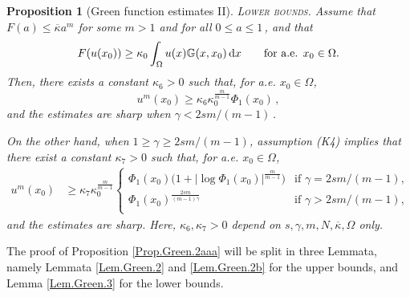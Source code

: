 \documentclass[11pt]{article}
\newtheorem{prop}[thm]{Proposition}
\numberwithin{equation}{section}
\newcommand{\dx}{\,{\rm d}x}
\newcommand{\n}{F}
\newcommand{\ka}{\overline{\kappa}}
\newcommand{\K}{{\mathbb G}}
\begin{document}
\begin{prop}[Green function estimates II]
\noindent\textsc{Lower bounds. }Assume that $F(a)\le \ka a^m$ for some $m>1$ and for all $0\leq a\le 1$\,, and that
\begin{equation}\label{Lem.Green.3.hyp.aaa}
\n(u(x_0))\ge \kappa_0\int_{\Omega} u(x)\K(x,x_0)\dx\qquad\mbox{for a.e. $x_0\in\Omega$.}
\end{equation}
 Then, there exists a constant $\kappa_{6}>0$ such that, for a.e. $x_0\in \Omega$,
\begin{equation}\label{Lem.Green.3.est.Lower.IIx}
 u^m(x_0)  \ge \kappa_6\kappa_0^{\frac{m}{m-1}} \Phi_1(x_0)\,,
\end{equation}
and the estimates are sharp when $\gamma< 2s m/(m-1)$\,.

\noindent On the other hand, when $1\ge \gamma\geq  2s m/(m-1)$, assumption (K4) implies that there exist a constant $\kappa_7>0$ such that, for a.e.  $x_0\in \Omega$,
\begin{equation*}
\begin{split}
  u^m(x_0)
&\ge
\kappa_{7} \kappa_0^{\frac{m}{m-1}}
\left\{
\begin{array}{ll}
\Phi_1(x_0)\big(1+|\log \Phi_1(x_0)|^{\frac{m}{m-1}}\big)&\text{if $\gamma= 2s m/(m-1)$},\\
\Phi_1(x_0)^{\frac{2sm}{(m-1)\gamma}}&\text{if $\gamma> 2s m/(m-1)$},\\
\end{array}
\right.
\end{split}
\end{equation*}
and the estimates are sharp. Here, $\kappa_6,\kappa_7>0$ depend on $s,\gamma, m, N,\ka, \Omega$ only.
\end{prop}
%
The proof of Proposition \ref{Prop.Green.2aaa} will be split in three Lemmata, namely Lemmata \ref{Lem.Green.2} and  \ref{Lem.Green.2b} for the upper bounds, and Lemma \ref{Lem.Green.3} for the lower bounds. \vspace{-2mm}
%
\end{document}
